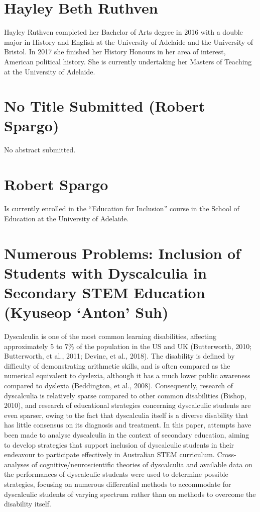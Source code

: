 \documentclass[twoside,12pt,a4paper,notitlepage]{memoir}
\begin{document}
\section*{Hayley Beth Ruthven}

Hayley Ruthven completed her Bachelor of Arts degree in 2016 with a double major in History and English at the University of Adelaide and the University of Bristol. In 2017 she finished her History Honours in her area of interest, American political history. She is currently undertaking her Masters of Teaching at the University of Adelaide.



\pagebreak
\section*{No Title Submitted (Robert Spargo)}
\label{aut:spargo}

No abstract submitted.

\section*{Robert Spargo}

Is currently enrolled in the ``Education for Inclusion'' course in the School of Education at the University of Adelaide.



\pagebreak
\section*{Numerous Problems: Inclusion of Students with Dyscalculia in Secondary STEM Education (Kyuseop `Anton' Suh)}
\label{aut:suh}


Dyscalculia is one of the most common learning disabilities, affecting approximately 5 to 7\% of the population in the US and UK (Butterworth, 2010; Butterworth, et al., 2011; Devine, et al., 2018). The disability is defined by difficulty of demonstrating arithmetic skills, and is often compared as the numerical equivalent to dyslexia, although it has a much lower public awareness compared to dyslexia (Beddington, et al., 2008). Consequently, research of dyscalculia is relatively sparse compared to other common disabilities (Bishop, 2010), and research of educational strategies concerning dyscalculic students are even sparser, owing to the fact that dyscalculia itself is a diverse disability that has little consensus on its diagnosis and treatment. In this paper, attempts have been made to analyse dyscalculia in the context of secondary education, aiming to develop strategies that support inclusion of dyscalculic students in their endeavour to participate effectively in Australian STEM curriculum. Cross-analyses of cognitive/neuroscientific theories of dyscalculia and available data on the performances of dyscalculic students were used to determine possible strategies, focusing on numerous differential methods to accommodate for dyscalculic students of varying spectrum rather than on methods to overcome the disability itself.
\end{document}

